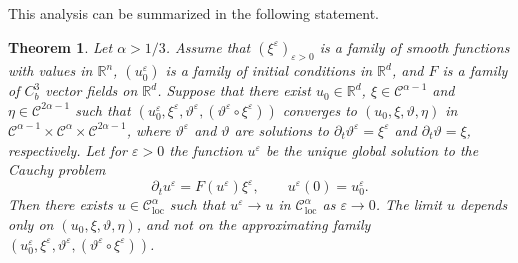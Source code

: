 \documentclass[11pt,a4paper]{article}
\newcommand{\tmop}[1]{\ensuremath{\operatorname{#1}}}
\newtheorem{theorem}{Theorem}
\theoremstyle{remark}
\newcommand{\R}{\mathbb{R}}
\newcommand{\CC}{\ensuremath{\mathscr{C}}}
\begin{document}
This analysis can be summarized in the following statement.

\begin{theorem}\label{theorem:rde existence uniqueness}
  Let $\alpha >1/3$. Assume that $(\xi^{\varepsilon} )_{\varepsilon >0}$ is a family of smooth functions with
  values in $\mathbb{R}^{n}$, $(u^\varepsilon_0)$ is a family of initial conditions in $\R^d$, and $F$ is a family of $C^{3}_{b}$ vector
  fields on $\mathbb{R}^{d}$. Suppose that there exist $u_0 \in \R^d$, $\xi \in \CC^{\alpha -1}$ and $\eta \in \CC^{2 \alpha -1}$ such that $(u_0^\varepsilon, \xi^{\varepsilon} , \vartheta^\varepsilon, (\vartheta^{\varepsilon} \circ   \xi^{\varepsilon} ) )$ converges to $(u_0, \xi , \vartheta, \eta )$ in $\CC^{\alpha -1} \times \CC^\alpha \times \CC^{2 \alpha -1}$, where
  $\vartheta^{\varepsilon}$ and $\vartheta$ are solutions to $\partial_{t}  \vartheta^{\varepsilon} = \xi^{\varepsilon}$ and $\partial_t \vartheta = \xi$, respectively. Let for $\varepsilon >0$ the function $u^{\varepsilon}$ be the
  unique global solution to the Cauchy problem
  \[
     \partial_{t} u^{\varepsilon} =F ( u^{\varepsilon} ) \xi^{\varepsilon} , \hspace{2em} u^{\varepsilon} ( 0 ) =u^\varepsilon_{0} .
  \]
  Then there exists $u \in \CC^{\alpha}_\mathrm{loc}$ such that $u^{\varepsilon} \rightarrow u$ in $\CC^{\alpha}_{\tmop{loc}}$ as $\varepsilon \rightarrow 0$. The limit $u$ depends only on $( u_{0} , \xi , \vartheta , \eta )$, and not on the approximating family $(u_0^\varepsilon, \xi^{\varepsilon} , \vartheta^\varepsilon,  ( \vartheta^{\varepsilon} \circ   \xi^{\varepsilon} ) )$.
\end{theorem}
\end{document}

